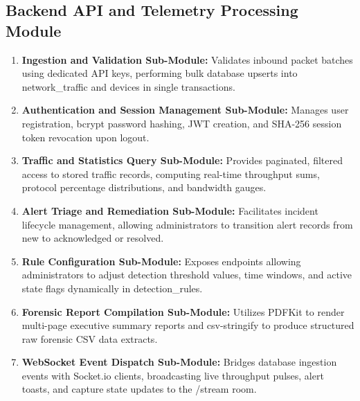 \documentclass[a4paper,12pt]{report}
\begin{document}
	\subsection{Backend API and Telemetry Processing Module}
	\begin{enumerate}
		\item \textbf{Ingestion and Validation Sub-Module:} Validates inbound packet batches using dedicated API keys, performing bulk database upserts into network\_traffic and devices in single transactions.
		\item \textbf{Authentication and Session Management Sub-Module:} Manages user registration, bcrypt password hashing, JWT creation, and SHA-256 session token revocation upon logout.
		\item \textbf{Traffic and Statistics Query Sub-Module:} Provides paginated, filtered access to stored traffic records, computing real-time throughput sums, protocol percentage distributions, and bandwidth gauges.
		\item \textbf{Alert Triage and Remediation Sub-Module:} Facilitates incident lifecycle management, allowing administrators to transition alert records from new to acknowledged or resolved.
		\item \textbf{Rule Configuration Sub-Module:} Exposes endpoints allowing administrators to adjust detection threshold values, time windows, and active state flags dynamically in detection\_rules.
		\item \textbf{Forensic Report Compilation Sub-Module:} Utilizes PDFKit to render multi-page executive summary reports and csv-stringify to produce structured raw forensic CSV data extracts.
		\item \textbf{WebSocket Event Dispatch Sub-Module:} Bridges database ingestion events with Socket.io clients, broadcasting live throughput pulses, alert toasts, and capture state updates to the /stream room.
	\end{enumerate}
	
\end{document}
